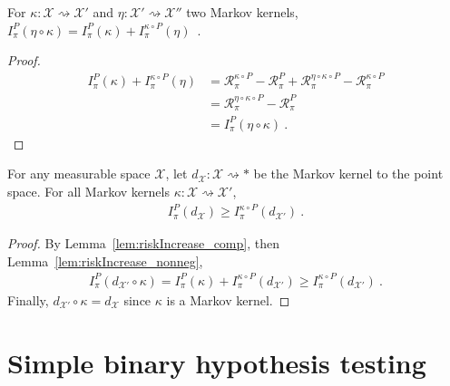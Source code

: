 \begin{lemma}
  \label{lem:riskIncrease_comp}
  \leanok
  For $\kappa : \mathcal X \rightsquigarrow \mathcal X'$ and $\eta : \mathcal X' \rightsquigarrow \mathcal X''$ two Markov kernels,
  $I^P_\pi(\eta \circ \kappa) = I^P_\pi(\kappa) + I^{\kappa \circ P}_\pi(\eta)$~.
\end{lemma}

\begin{proof}\leanok
\uses{}
\begin{align*}
I^P_\pi(\kappa) + I^{\kappa \circ P}_\pi(\eta)
&= \mathcal R^{\kappa \circ P}_\pi - \mathcal R^{P}_\pi + \mathcal R^{\eta \circ \kappa \circ P}_\pi - \mathcal R^{\kappa \circ P}_\pi
\\
&= \mathcal R^{\eta \circ \kappa \circ P}_\pi - \mathcal R^{P}_\pi
\\
&= I^P_\pi(\eta \circ \kappa)
\: .
\end{align*}
\end{proof}

\begin{lemma}
  \label{lem:riskIncrease_comp_del}
  For any measurable space $\mathcal X$, let $d_{\mathcal X} : \mathcal X \rightsquigarrow *$ be the Markov kernel to the point space.
  For all Markov kernels $\kappa : \mathcal X \rightsquigarrow \mathcal X'$,
  \begin{align*}
  I_\pi^P(d_{\mathcal X}) \ge I_\pi^{\kappa \circ P}(d_{\mathcal X'}) \: .
  \end{align*}
\end{lemma}

\begin{proof}%
{}
By Lemma~\ref{lem:riskIncrease_comp}, then Lemma~\ref{lem:riskIncrease_nonneg},
\begin{align*}
I_\pi^P(d_{\mathcal X'} \circ \kappa)
= I^P_\pi(\kappa) + I^{\kappa \circ P}_\pi(d_{\mathcal X'})
\ge I_\pi^{\kappa \circ P}(d_{\mathcal X'})
\: .
\end{align*}
Finally, $d_{\mathcal X'} \circ \kappa = d_{\mathcal X}$ since $\kappa$ is a Markov kernel.
\end{proof}




\section{Simple binary hypothesis testing}

